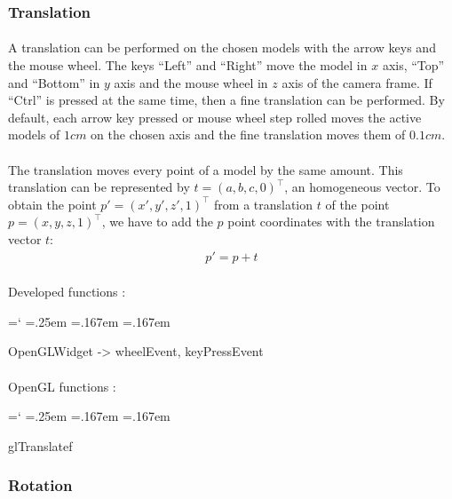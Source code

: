 \documentclass[12pt]{report}
\DeclareRobustCommand*{\ttfamily}{
  \origttfamily
  \hyphenchar\font=`\-\relax
  \fontdimen3\font=.25em\relax
  \fontdimen4\font=.167em\relax
  \fontdimen7\font=.167em\relax
}
\newenvironment{code}{\ttfamily}{}
\begin{document}
\subsubsection{Translation}
\paragraph{}
	A translation can be performed on the chosen models with the arrow keys and the mouse wheel. The keys ``Left'' and ``Right'' move the model in $x$ axis, ``Top'' and ``Bottom'' in $y$ axis and the mouse wheel in $z$ axis of the camera frame. If ``Ctrl'' is pressed at the same time, then a fine translation can be performed. By default, each arrow key pressed or mouse wheel step rolled moves the active models of $1 cm$ on the chosen axis and the fine translation moves them of $0.1 cm$.


\paragraph{}
	The translation moves every point of a model by the same amount. This translation can be represented by $t=(a, b, c, 0)^{\top}$, an homogeneous vector. To obtain the point $p'=(x', y', z', 1)^{\top}$ from a translation $t$ of the point $p=(x, y, z, 1)^{\top}$, we have to add the $p$ point coordinates with the translation vector $t$:
\begin{gather}
p' = p + t
\end{gather}


\paragraph{}
	Developed functions :

	\begin{code}
	OpenGLWidget -> wheelEvent, keyPressEvent
	\end{code}

\paragraph{}
	OpenGL functions :

	\begin{code}
	glTranslatef
	\end{code}


\subsubsection{Rotation}	\label{subsubsec:rotation}
\end{document}
